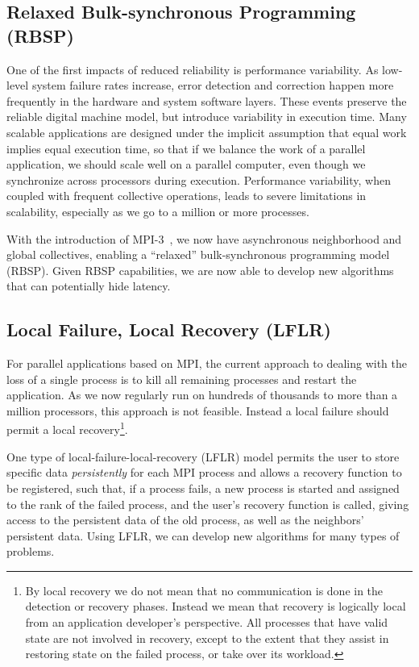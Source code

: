 \documentclass[10pt, twocolumn]{IEEEtran}
\begin{document}
\subsection{Relaxed Bulk-synchronous Programming (RBSP)}
One of the first impacts of reduced reliability is performance variability.  As low-level system failure rates increase, error detection and correction happen more frequently in the hardware and system software layers.  These events preserve the reliable digital machine model, but introduce variability in execution time.  Many scalable applications are designed under the implicit assumption that equal work implies equal execution time, so that if we balance the work of a parallel application, we should scale well on a parallel computer, even though we synchronize across processors during execution.  Performance variability, when coupled with frequent collective operations, leads to severe limitations in scalability, especially as we go to a million or more processes.

With the introduction of MPI-3~\cite{MPI-3.0}, we now have asynchronous neighborhood and global collectives, enabling a ``relaxed'' bulk-synchronous programming model (RBSP).  Given RBSP capabilities, we are now able to develop new algorithms that can potentially hide latency.

\subsection{Local Failure, Local Recovery (LFLR)}\label{subsect:LFLR}
For parallel applications based on MPI, the current approach to dealing with the loss of a single process is to kill all remaining processes and restart the application.  As we now regularly run on hundreds of thousands to more than a million processors, this approach is not feasible.  Instead a local failure should permit a local recovery\footnote{By local recovery we do not mean that no communication is done in the detection or recovery phases.  Instead we mean that recovery is logically local from an application developer's perspective.  All processes that have valid state are not involved in recovery, except to the extent that they assist in restoring state on the failed process, or take over its workload.}.  

One type of local-failure-local-recovery (LFLR) model permits the user to store specific data {\it persistently} for each MPI process and allows a recovery function to be registered, such that, if a process fails, a new process is started and assigned to the rank of the failed process, and the user's recovery function is called, giving access to the persistent  data of the old process, as well as the neighbors' persistent data.  Using LFLR, we can develop new algorithms for many types of problems.
\end{document}

